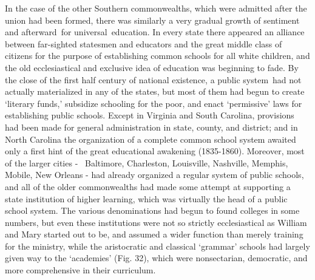 \documentclass[]{book}
\begin{document}
In the case of the other Southern commonwealths, which were admitted after the union had been formed, there was similarly a very gradual growth of sentiment and afterward~for universal~education. In every state there appeared an alliance between far-sighted statesmen and educators and the great middle class of citizens for the purpose of establishing common schools for all white children, and the old ecclesiastical and exclusive idea of education was beginning to fade. By the close of the first half century of national existence, a public system~had not actually materialized in any of the states, but most of them had begun to create `literary funds,' subsidize schooling for the poor, and enact `permissive' laws for establishing public schools. Except in Virginia and South Carolina, provisions had been made for general administration in state, county, and district; and in North Carolina the organization of a complete common school system awaited only a first hint of the great educational awakening (1835-1860). Moreover, most of the larger cities - ~Baltimore, Charleston, Louisville, Nashville, Memphis, Mobile, New Orleans - had already organized a regular system of public schools, and all of the older commonwealths had made some attempt at supporting a state institution of higher learning, which was virtually the head of a public school system. The various denominations had begun to found colleges in some numbers, but even these institutions were not so strictly ecclesiastical as William and Mary started out to be, and assumed a wider function than merely training for the ministry, while the aristocratic and classical `grammar' schools had largely given way to the `academies' (Fig. 32), which were nonsectarian, democratic, and more comprehensive in their curriculum.
\end{document}
